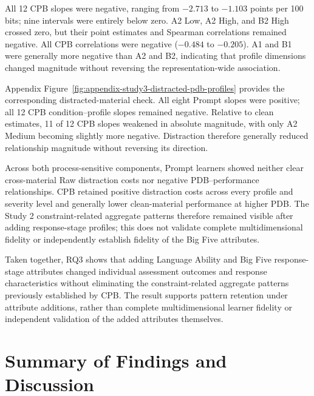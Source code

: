 All 12 CPB slopes were negative, ranging from $-2.713$ to $-1.103$ points per 100 bits; nine intervals were entirely below zero. A2 Low, A2 High, and B2 High crossed zero, but their point estimates and Spearman correlations remained negative. All CPB correlations were negative ($-0.484$ to $-0.205$). A1 and B1 were generally more negative than A2 and B2, indicating that profile dimensions changed magnitude without reversing the representation-wide association.

Appendix Figure~\ref{fig:appendix-study3-distracted-pdb-profiles} provides the corresponding distracted-material check. All eight Prompt slopes were positive; all 12 CPB condition--profile slopes remained negative. Relative to clean estimates, 11 of 12 CPB slopes weakened in absolute magnitude, with only A2 Medium becoming slightly more negative. Distraction therefore generally reduced relationship magnitude without reversing its direction.

Across both process-sensitive components, Prompt learners showed neither clear cross-material Raw distraction costs nor negative PDB--performance relationships. CPB retained positive distraction costs across every profile and severity level and generally lower clean-material performance at higher PDB. The Study 2 constraint-related aggregate patterns therefore remained visible after adding response-stage profiles; this does not validate complete multidimensional fidelity or independently establish fidelity of the Big Five attributes.

Taken together, RQ3 shows that adding Language Ability and Big Five response-stage attributes changed individual assessment outcomes and response characteristics without eliminating the constraint-related aggregate patterns previously established by CPB. The result supports pattern retention under attribute additions, rather than complete multidimensional learner fidelity or independent validation of the added attributes themselves.

\FloatBarrier

\begingroup
{}
\section{Summary of Findings and Discussion}
\label{sec:results-discussion}

